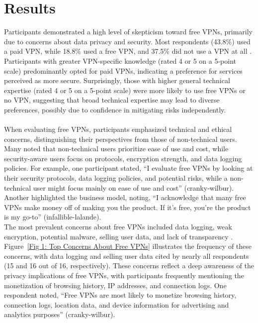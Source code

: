 \documentclass[11pt,a4paper]{article}
\begin{document}
\section{Results}

Participants demonstrated a high level of skepticism toward free VPNs, primarily due to concerns about data privacy and security. Most respondents (43.8\%) used a paid VPN, while 18.8\% used a free VPN, and 37.5\% did not use a VPN at all \cite{sombatruang2020}. Participants with greater VPN-specific knowledge (rated 4 or 5 on a 5-point scale) predominantly opted for paid VPNs, indicating a preference for services perceived as more secure. Surprisingly, those with higher general technical expertise (rated 4 or 5 on a 5-point scale) were more likely to use free VPNs or no VPN, suggesting that broad technical expertise may lead to diverse preferences, possibly due to confidence in mitigating risks independently.
\\\\
When evaluating free VPNs, participants emphasized technical and ethical concerns, distinguishing their perspectives from those of non-technical users. Many noted that non-technical users prioritize ease of use and cost, while security-aware users focus on protocols, encryption strength, and data logging policies. For example, one participant stated, ``I evaluate free VPNs by looking at their security protocols, data logging policies, and potential risks, while a non-technical user might focus mainly on ease of use and cost'' (cranky-wilbur). Another highlighted the business model, noting, ``I acknowledge that many free VPNs make money off of making you the product. If it's free, you're the product is my go-to'' (infallible-lalande).\\
The most prevalent concerns about free VPNs included data logging, weak encryption, potential malware, selling user data, and lack of transparency \cite{ikram2016,blancaflor2024}. Figure~\ref{Fig 1: Top Concerns About Free VPNs} illustrates the frequency of these concerns, with data logging and selling user data cited by nearly all respondents (15 and 16 out of 16, respectively). These concerns reflect a deep awareness of the privacy implications of free VPNs, with participants frequently mentioning the monetization of browsing history, IP addresses, and connection logs. One respondent noted, ``Free VPNs are most likely to monetize browsing history, connection logs, location data, and device information for advertising and analytics purposes'' (cranky-wilbur).
\end{document}
